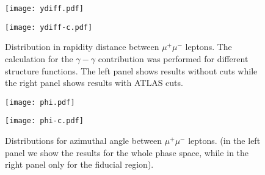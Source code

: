 \begin{figure}[!htbp]
\begin{minipage}{0.47\textwidth}
 \centerline{\texttt{[image: ydiff.pdf]}}
\end{minipage}
\begin{minipage}{0.47\textwidth}
 \centerline{\texttt{[image: ydiff-c.pdf]}}
\end{minipage}
\caption{
Distribution in rapidity distance between $\mu^+\mu^-$ leptons.
The calculation for the $\gamma-\gamma$ contribution
was performed for different structure functions. 
The left panel shows results  without cuts while the right panel 
shows results with ATLAS cuts.
}
\label{fig:dsig_dy}
\end{figure}

\begin{figure}[!htbp]
\begin{minipage}{0.47\textwidth}
 \centerline{\texttt{[image: phi.pdf]}}
\end{minipage}
\begin{minipage}{0.47\textwidth}
 \centerline{\texttt{[image: phi-c.pdf]}}
\end{minipage}
\caption{
Distributions for azimuthal angle between $\mu^+\mu^-$ leptons. (in the left panel we show the results for the whole phase space, while in the right panel only for the fiducial region).
}
\label{fig:dsig_dy}
\end{figure}




